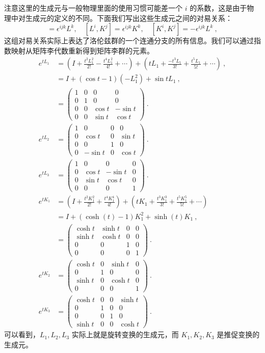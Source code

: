 注意这里的生成元与一般物理里面的使用习惯可能差一个 $i$ 的系数，这是由于物理中对生成元的定义的不同。下面我们写出这些生成元之间的对易关系：
\begin{equation}
[L^i,L^j]=\epsilon^{ijk}L^k,\quad
[L^i,K^j]=\epsilon^{ijk}K^k,\quad
[K^i,K^j]=-\epsilon^{ijk}L^k~,
\end{equation}
这组对易关系实际上表达了洛伦兹群的一个连通分支的所有信息。我们可以通过指数映射从矩阵李代数重新得到矩阵李群的元素。
\begin{equation}
\begin{aligned}
e^{tL_1}&=(I+\frac{t^2L_1^2}{2!}-\frac{t^4L_1^2}{4!}+\cdots)+(tL_1+\frac{-t^3L_1}{3!}+\frac{t^5L_1}{5!}+\cdots)~,\\
&=I+(\cos t-1)(-L_1^2)+\sin t L_1~,\\
&=
\begin{pmatrix}
1 & 0 & 0 & 0\\
0 & 1 & 0 & 0\\
0 & 0 & \cos t & -\sin t\\
0 & 0 & \sin t & \cos t
\end{pmatrix}~.\\
e^{tL_2}&=
\begin{pmatrix}
1 & 0 & 0 & 0\\
0 & \cos t & 0 & \sin t\\
0 & 0 & 1 & 0\\
0 & -\sin t & 0 & \cos t
\end{pmatrix}~.\\
e^{tL_3}&=
\begin{pmatrix}
1 & 0 & 0 & 0\\
0 & \cos t & -\sin t & 0\\
0 & \sin t & \cos t & 0\\
0 & 0 & 0 & 1
\end{pmatrix}~.
\\
e^{tK_1}&=(I+\frac{t^2K_1^2}{2!}+\frac{t^4K_1^4}{4!})+(tK_1+\frac{t^3K_1^3}{3!}+\frac{t^5K_1^5}{5!}+\cdots)\\
&=I+(\cosh(t)-1)K_1^2+\sinh(t) K_1~,\\
&=\begin{pmatrix}
\cosh t & \sinh t & 0 & 0\\
\sinh t & \cosh t & 0 & 0\\
0 & 0 & 1 & 0\\
0 & 0 & 0 & 1
\end{pmatrix}~.
\\
e^{t K_2}&=\begin{pmatrix}
\cosh t & 0 & \sinh t & 0\\
0 & 1 & 0 & 0\\
\sinh t & 0 & \cosh t & 0\\
0 & 0 & 0 & 1
\end{pmatrix}~.
\\
e^{t K_3}&=\begin{pmatrix}
\cosh t & 0 & 0 & \sinh t\\
0 & 1 & 0 & 0\\
0 & 0 & 1 & 0\\
\sinh t & 0 & 0 & \cosh t
\end{pmatrix}~.
\end{aligned}
\end{equation}
可以看到，$L_1,L_2,L_3$ 实际上就是旋转变换的生成元，而 $K_1,K_2,K_3$ 是推促变换的生成元。